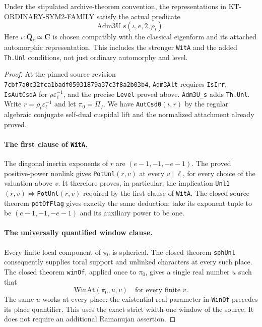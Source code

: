 \begin{corollary}
Under the stipulated archive-theorem convention, the
representations in KT-ORDINARY-SYM2-FAMILY satisfy the actual
predicate
\[
                 \mathrm{Adm3U\_s}(\iota,e,2,\rho_t).          \tag{OS.10}
\]
Here $\iota:\overline{\mathbf Q}_\ell\simeq\mathbf C$ is
chosen compatibly with the classical eigenform and its
attached automorphic representation. This includes the
stronger \texttt{WitA} and the added \texttt{Th.Unl}
conditions, not just ordinary automorphy and level.
\end{corollary}
\begin{proof}
At the pinned source revision
\texttt{7cbf7a0c32fca1badf05931879a37c3f8a2b03b4},
\texttt{Adm3Alt} requires \texttt{IsIrr},
\texttt{IsAutCsdA} for $\rho\varepsilon_\ell^{-1}$, and
the precise \texttt{Level} proved above.
\texttt{Adm3U\_s} adds \texttt{Th.Unl}.
Write $r=\rho_t\varepsilon_\ell^{-1}$ and let
$\pi_0=\Pi_f$. We have \texttt{AutCsd0}$(\iota,r)$ by the
regular algebraic conjugate self-dual cuspidal lift and
the normalized attachment already proved.

\paragraph{The first clause of \texttt{WitA}.}
The diagonal inertia exponents of $r$ are
$(e-1,-1,-e-1)$. The proved positive-power nonlink gives
\texttt{PotUnl}$(r,v)$ at every $v\mid\ell$, for every
choice of the valuation above $v$. It therefore proves,
in particular, the implication
\texttt{Unl1}$(r,v)\Rightarrow$\texttt{PotUnl}$(r,v)$
required by the first clause of \texttt{WitA}. The closed
source theorem \texttt{potOfFlag} gives exactly the same
deduction: take its exponent tuple to be
$(e-1,-1,-e-1)$ and its auxiliary power to be one.

\paragraph{The universally quantified window clause.}
Every finite local component of $\pi_0$ is spherical.
The closed theorem \texttt{sphUnl} consequently supplies
toral support and unlinked characters at every such place.
The closed theorem \texttt{winOf}, applied once to $\pi_0$,
gives a single real number $u$ such that
\[
                  \mathrm{WinAt}(\pi_0,u,v)
                        \quad\text{for every finite }v.     \tag{OS.11}
\]
The same $u$ works at every place: the existential real
parameter in \texttt{WinOf} precedes its place quantifier.
This uses the exact strict width-one window of the source.
It does not require an additional Ramanujan assertion.


\end{proof}
